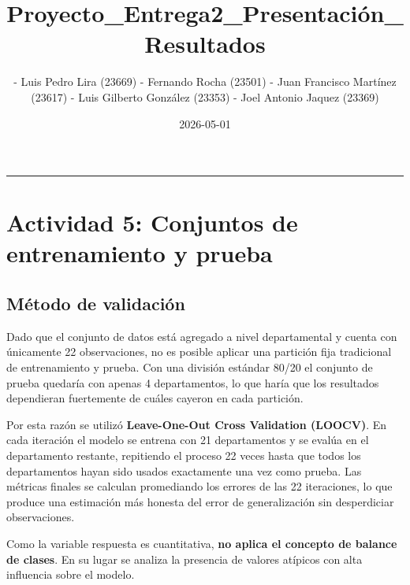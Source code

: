 \documentclass[
]{article}
\title{Proyecto\_Entrega2\_Presentación\_Resultados}
\author{- Luis Pedro Lira (23669) - Fernando Rocha (23501) - Juan
Francisco Martínez (23617) - Luis Gilberto González (23353) - Joel
Antonio Jaquez (23369)}
\date{2026-05-01}
\begin{document}
\maketitle

\begin{center}\rule{0.5\linewidth}{0.5pt}\end{center}

\hypertarget{actividad-5-conjuntos-de-entrenamiento-y-prueba}{%
\section{Actividad 5: Conjuntos de entrenamiento y
prueba}\label{actividad-5-conjuntos-de-entrenamiento-y-prueba}}

\hypertarget{muxe9todo-de-validaciuxf3n}{%
\subsection{Método de validación}\label{muxe9todo-de-validaciuxf3n}}

Dado que el conjunto de datos está agregado a nivel departamental y
cuenta con únicamente 22 observaciones, no es posible aplicar una
partición fija tradicional de entrenamiento y prueba. Con una división
estándar 80/20 el conjunto de prueba quedaría con apenas 4
departamentos, lo que haría que los resultados dependieran fuertemente
de cuáles cayeron en cada partición.

Por esta razón se utilizó \textbf{Leave-One-Out Cross Validation
(LOOCV)}. En cada iteración el modelo se entrena con 21 departamentos y
se evalúa en el departamento restante, repitiendo el proceso 22 veces
hasta que todos los departamentos hayan sido usados exactamente una vez
como prueba. Las métricas finales se calculan promediando los errores de
las 22 iteraciones, lo que produce una estimación más honesta del error
de generalización sin desperdiciar observaciones.

Como la variable respuesta es cuantitativa, \textbf{no aplica el
concepto de balance de clases}. En su lugar se analiza la presencia de
valores atípicos con alta influencia sobre el modelo.
\end{document}
